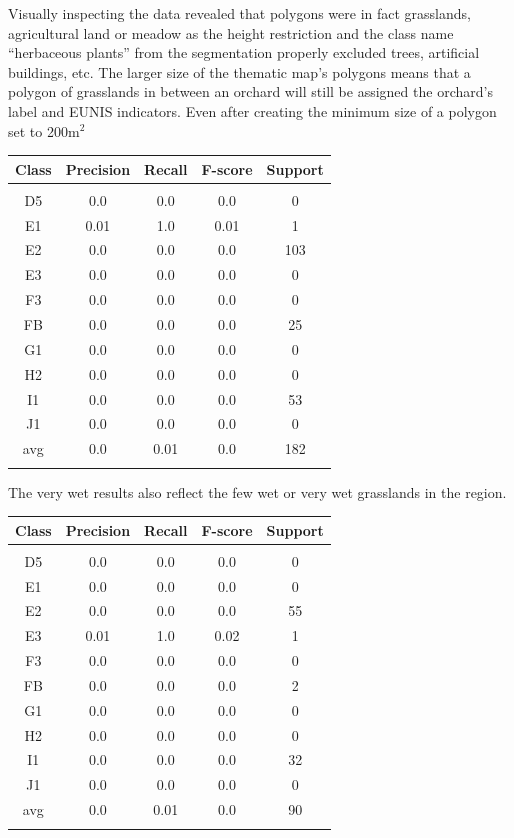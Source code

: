 \documentclass[authoryear, review,12pt,number]{elsarticle}
\begin{document}
Visually inspecting the data revealed that polygons were in fact grasslands, 
agricultural land or meadow as the height restriction and the class name 
``herbaceous plants'' from the segmentation properly excluded trees, artificial 
buildings, etc. The larger size of the thematic map's 
polygons means that a polygon of grasslands in between an orchard will still be 
assigned the orchard's label and EUNIS indicators. Even after creating the 
minimum size of a polygon set to 200m$^{2}$
\begin{tabular}{c c c c c}
Class & Precision & Recall & F-score & Support\\
\hline\\
D5 & 0.0 & 0.0 & 0.0 & 0\\
E1 & 0.01 & 1.0 & 0.01 & 1\\
E2 & 0.0 & 0.0 & 0.0 & 103\\
E3 & 0.0 & 0.0 & 0.0 & 0\\
F3 & 0.0 & 0.0 & 0.0 & 0\\
FB & 0.0 & 0.0 & 0.0 & 25\\
G1 & 0.0 & 0.0 & 0.0 & 0\\
H2 & 0.0 & 0.0 & 0.0 & 0\\
I1 & 0.0 & 0.0 & 0.0 & 53\\
J1 & 0.0 & 0.0 & 0.0 & 0\\
avg & 0.0 & 0.01 & 0.0 & 182\\
\label{fig_dry_classification}
\end{tabular}
The very wet results also reflect the few wet or very wet grasslands in the 
region.
\begin{tabular}{c c c c c}
Class & Precision & Recall & F-score & Support\\
\hline\\
D5 & 0.0 & 0.0 & 0.0 & 0\\
E1 & 0.0 & 0.0 & 0.0 & 0\\
E2 & 0.0 & 0.0 & 0.0 & 55\\
E3 & 0.01 & 1.0 & 0.02 & 1\\
F3 & 0.0 & 0.0 & 0.0 & 0\\
FB & 0.0 & 0.0 & 0.0 & 2\\
G1 & 0.0 & 0.0 & 0.0 & 0\\
H2 & 0.0 & 0.0 & 0.0 & 0\\
I1 & 0.0 & 0.0 & 0.0 & 32\\
J1 & 0.0 & 0.0 & 0.0 & 0\\
avg & 0.0 & 0.01 & 0.0 & 90\\
\label{fig_very_wet_classification}
\end{tabular}
\end{document}

